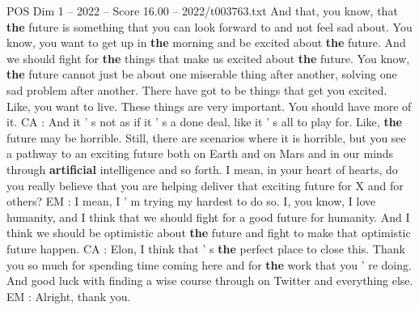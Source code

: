 \begin{textsample}{POS Dim 1 – 2022 – Score 16.00 – 2022/t003763.txt}
And that, you know, that \textbf{the} future is something that you can look forward to and not feel sad about.
You know, you want to get up in \textbf{the} morning and be excited about \textbf{the} future.
And we should fight for \textbf{the} things that make us excited about \textbf{the} future.
You know, \textbf{the} future cannot just be about one miserable thing after another, solving one sad problem after another.
There have got to be things that get you excited.
Like, you want to live.
These things are very important.
You should have more of it.
CA : And it ' s not as if it ' s a done deal, like it ' s all to play for.
Like, \textbf{the} future may be horrible.
Still, there are scenarios where it is horrible, but you see a pathway to an exciting future both on Earth and on Mars and in our minds through \textbf{artificial} intelligence and so forth.
I mean, in your heart of hearts, do you really believe that you are helping deliver that exciting future for X and for others?
EM : I mean, I ' m trying my hardest to do so.
I, you know, I love humanity, and I think that we should fight for a good future for humanity.
And I think we should be optimistic about \textbf{the} future and fight to make that optimistic future happen.
CA : Elon, I think that ' s \textbf{the} perfect place to close this.
Thank you so much for spending time coming here and for \textbf{the} work that you ' re doing.
And good luck with finding a wise course through on Twitter and everything else.
EM : Alright, thank you.

\end{textsample}
